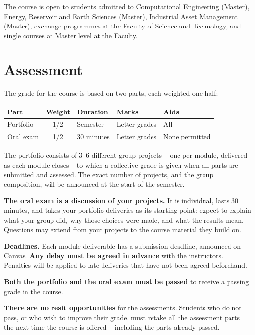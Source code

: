 \documentclass[letterpaper,12pt,oneside]{article}
\newcommand{\numprojects}{3--6}        %
\begin{document}
The course is open to students admitted to Computational Engineering (Master), Energy, Reservoir and Earth Sciences (Master), Industrial Asset Management (Master), exchange programmes at the Faculty of Science and Technology, and single courses at Master level at the Faculty.


\section*{Assessment}

The grade for the course is based on two parts, each weighted one half:

\vspace{0.5em}
\begin{center}
\begin{tabular}{|l|c|l|l|l|}
\hline
\textbf{Part} & \textbf{Weight} & \textbf{Duration} & \textbf{Marks} & \textbf{Aids} \\
\hline
Portfolio & 1/2 & Semester & Letter grades & All \\
\hline
Oral exam & 1/2 & 30 minutes & Letter grades & None permitted \\
\hline
\end{tabular}
\end{center}
\vspace{0.5em}

The portfolio consists of \numprojects{} different group projects -- one per module, delivered as each module closes -- to which a collective grade is given when all parts are submitted and assessed. The exact number of projects, and the group composition, will be announced at the start of the semester.

\textbf{The oral exam is a discussion of your projects.} It is individual, lasts 30 minutes, and takes your portfolio deliveries as its starting point: expect to explain what your group did, why those choices were made, and what the results mean. Questions may extend from your projects to the course material they build on.

\textbf{Deadlines.} Each module deliverable has a submission deadline, announced on Canvas. \textbf{Any delay must be agreed in advance} with the instructors. Penalties will be applied to late deliveries that have not been agreed beforehand.

\textbf{Both the portfolio and the oral exam must be passed} to receive a passing grade in the course.

\textbf{There are no resit opportunities} for the assessments. Students who do not pass, or who wish to improve their grade, must retake all the assessment parts the next time the course is offered -- including the parts already passed.
\end{document}
